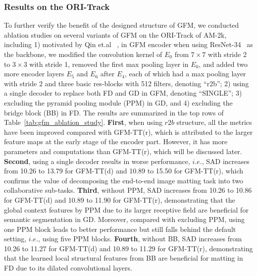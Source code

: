 \documentclass[twocolumn]{svjour3}
\begin{document}
\subsubsection{Results on the ORI-Track} 
To further verify the benefit of the designed structure of GFM, we conducted ablation studies on several variants of GFM on the ORI-Track of AM-2k, including 1) motivated by Qin et.al ~\citep{Qin_2019_CVPR}, in GFM encoder when using ResNet-34~\citep{he2016deep} as the backbone, we modified the convolution kernel of $E_0$ from $7\times7$ with stride 2 to $3\times3$ with stride 1, removed the first max pooling layer in $E_0$, and added two more encoder layers $E_5$ and $E_6$ after $E_4$, each of which had a max pooling layer with stride 2 and three basic res-blocks with 512 filters, denoting ``r2b''; 2) using a single decoder to replace both FD and GD in GFM, denoting ``SINGLE''; 3) excluding the pyramid pooling module (PPM) in GD, and 4) excluding the bridge block (BB) in FD. The results are summarized in the top rows of Table~\ref{tab:gfm_ablation_study}. \textbf{First}, when using $r2b$ structure, all the metrics have been improved compared with GFM-TT(r), which is attributed to the larger feature maps at the early stage of the encoder part. However, it has more parameters and computations than GFM-TT(r), which will be discussed later. \textbf{Second}, using a single decoder results in worse performance, $i.e.$, SAD increases from 10.26 to 13.79 for GFM-TT(d) and 10.89 to 15.50 for GFM-TT(r), which confirms the value of decomposing the end-to-end image matting task into two collaborative sub-tasks. \textbf{Third}, without PPM, SAD increases from 10.26 to 10.86 for GFM-TT(d) and 10.89 to 11.90 for GFM-TT(r), demonstrating that the global context features by PPM due to its larger receptive field are beneficial for semantic segmentation in GD. Moreover, compared with excluding PPM, using one PPM block leads to better performance but still falls behind the default setting, $i.e.$, using five PPM blocks. \textbf{Fourth}, without BB, SAD increases from 10.26 to 11.27 for GFM-TT(d) and 10.89 to 11.29 for GFM-TT(r), demonstrating that the learned local structural features from BB are beneficial for matting in FD due to its dilated convolutional layers.
\end{document}
